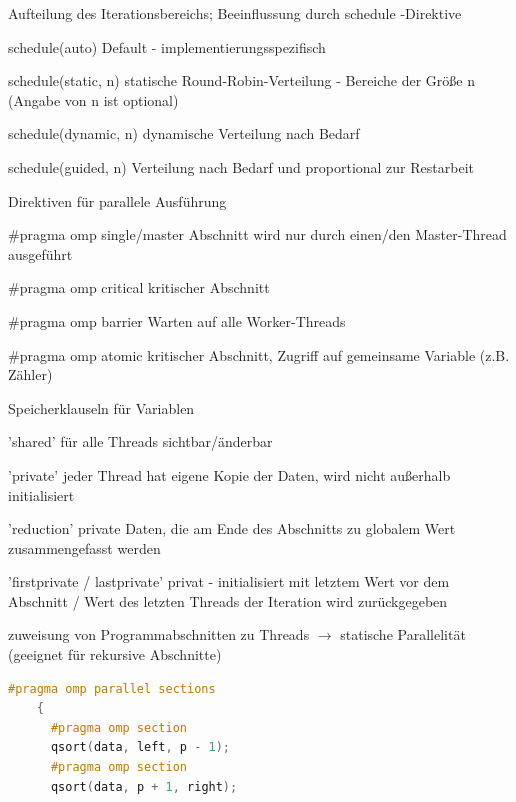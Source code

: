 \documentclass[10pt]{article}
\begin{document}
\begin{itemize*}
    \item Aufteilung des Iterationsbereichs; Beeinflussung durch schedule -Direktive
    \begin{description*}
      \item[schedule(auto)] Default - implementierungsspezifisch
      \item[schedule(static, n)] statische Round-Robin-Verteilung - Bereiche der Größe n (Angabe von n ist optional)
      \item[schedule(dynamic, n)] dynamische Verteilung nach Bedarf
      \item[schedule(guided, n)] Verteilung nach Bedarf und proportional zur Restarbeit
    \end{description*}
    \item Direktiven für parallele Ausführung
    \begin{description*}
      \item[\#pragma omp single/master] Abschnitt wird nur durch einen/den Master-Thread ausgeführt
      \item[\#pragma omp critical] kritischer Abschnitt
      \item[\#pragma omp barrier] Warten auf alle Worker-Threads
      \item[\#pragma omp atomic] kritischer Abschnitt, Zugriff auf gemeinsame Variable (z.B. Zähler)
    \end{description*}
    \item Speicherklauseln für Variablen
    \begin{itemize*}
      \item 'shared' für alle Threads sichtbar/änderbar
      \item 'private' jeder Thread hat eigene Kopie der Daten, wird nicht außerhalb initialisiert
      \item 'reduction' private Daten, die am Ende des Abschnitts zu globalem Wert zusammengefasst werden
      \item 'firstprivate / lastprivate' privat - initialisiert mit letztem Wert vor dem Abschnitt / Wert des letzten Threads der Iteration wird zurückgegeben
    \end{itemize*}
    \item zuweisung von Programmabschnitten zu Threads $\rightarrow$ statische Parallelität (geeignet für rekursive Abschnitte)
    \begin{lstlisting}[language=C++]
    #pragma omp parallel sections
    {
      #pragma omp section
      qsort(data, left, p - 1);
      #pragma omp section
      qsort(data, p + 1, right);

\end{lstlisting}
\end{itemize*}
\end{document}
